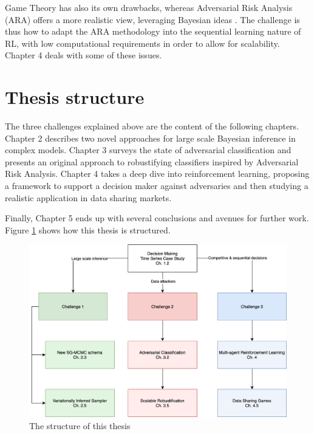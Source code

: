 Game Theory has also its own drawbacks, whereas Adversarial Risk Analysis (ARA) offers a more realistic view, leveraging Bayesian ideas \parencite{Banks}. The challenge is thus how to adapt the ARA methodology into the sequential learning nature of RL, with low computational requirements in order to allow for scalability.
Chapter 4 deals with some of these issues.


\section{Thesis structure}

The three challenges explained above are the content of the following chapters. Chapter 2 describes two novel approaches for large scale Bayesian inference in complex models. Chapter 3 surveys the state of adversarial classification and presents an original approach to robustifying classifiers inspired by Adversarial Risk Analysis. Chapter 4 takes a deep dive into reinforcement learning, proposing a framework to support a decision maker against adversaries and then studying a realistic application in data sharing markets.

Finally, Chapter 5 ends up with several conclusions and avenues for further work. Figure \ref{fig:thesis} shows how this thesis is structured.


\begin{figure}[h]
\centering
\includegraphics[scale=0.8]{figures/thesis_structure.png}
\caption{The structure of this thesis}\label{fig:thesis}
\end{figure}

